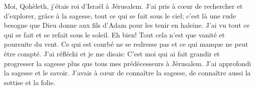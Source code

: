 Moi, Qohèleth, j’étais roi d’Israël à Jérusalem.
J’ai pris à cœur de rechercher et d’explorer, grâce à la sagesse,
	tout ce qui se fait sous le ciel;
	c’est là une rude besogne que Dieu donne aux fils d’Adam
		pour les tenir en haleine.
J’ai vu tout ce qui se fait et se refait sous le soleil.
	Eh bien! Tout cela n’est que vanité et poursuite du vent.
Ce qui est courbé ne se redresse pas et ce qui manque ne peut être compté.
J’ai réfléchi et je me disais:
	C’est moi qui ai fait grandir et progresser la sagesse
		plus que tous mes prédécesseurs à Jérusalem.
	J’ai approfondi la sagesse et le savoir.
J’avais à cœur de connaître la sagesse,
	de connaître aussi la sottise et la folie.
